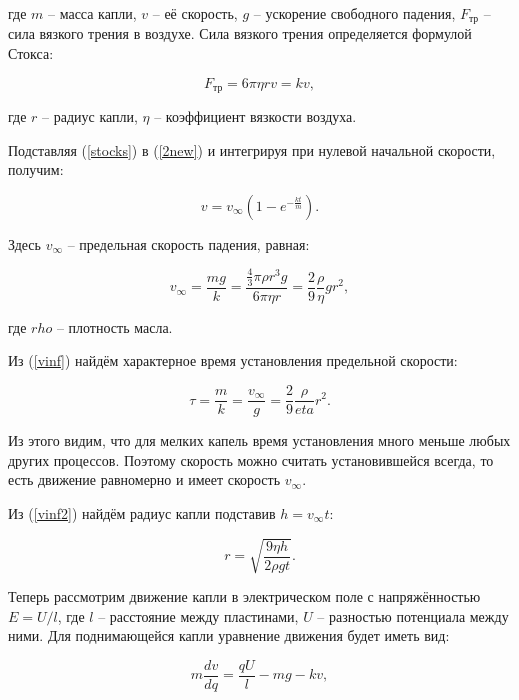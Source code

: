 \documentclass[a4paper,12pt]{article} %
\begin{document}
\noindent где $m$ -- масса капли, $v$ -- её скорость, $g$ -- ускорение свободного падения, $F_\text{тр}$ -- сила вязкого трения в воздухе. Сила вязкого трения определяется формулой Стокса:

\begin{equation}
F_\text{тр} = 6 \pi \eta r v = kv, \label{stocks}
\end{equation}

\noindent где $r$ -- радиус капли, $\eta$ -- коэффициент вязкости воздуха.

Подставляя (\ref{stocks}) в (\ref{2new}) и интегрируя при нулевой начальной скорости, получим:

\begin{equation}
v = v_\infty \left( 1 - e^{- \frac{kt}{m}} \right). \label{vinf}
\end{equation}

\noindent Здесь $v_\infty$ -- предельная скорость падения, равная:

\begin{equation}
v_\infty = \frac{mg}{k} = \frac{\frac{4}{3}\pi\rho r^3 g}{6 \pi \eta r} = \frac{2}{9} \frac{\rho}{\eta} g r^2, \label{vinf2}
\end{equation}

\noindent где $rho$ -- плотность масла.

Из (\ref{vinf}) найдём характерное время установления предельной скорости:

\begin{equation}
\tau = \frac{m}{k} = \frac{v_\infty}{g} = \frac{2}{9} \frac{\rho}{eta} r^2.
\end{equation}

\noindent Из этого видим, что для мелких капель время установления много меньше любых других процессов. Поэтому скорость можно считать установившейся всегда, то есть движение равномерно и имеет скорость $v_\infty$.

Из (\ref{vinf2}) найдём радиус капли подставив $h = v_\infty t$:

\begin{equation}
r = \sqrt{\frac{9\eta h}{2 \rho g t}}. \label{radius}
\end{equation}

Теперь рассмотрим движение капли в электрическом поле с напряжённостью $E = U/l$, где $l$ -- расстояние между пластинами, $U$ -- разностью потенциала между ними. Для поднимающейся капли уравнение движения будет иметь вид:

\begin{equation}
m \frac{dv}{dq} = \frac{qU}{l} - mg - kv, \label{new2}
\end{equation}
\end{document}
